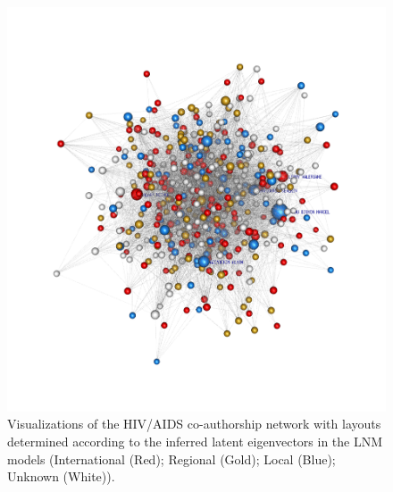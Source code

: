 \begin{figure}[!h]
\includegraphics[scale=0.18,trim={5cm 5cm 5cm 5cm}]{Chapters/hiv/statMod/lnm_mod7_allAttributes.png}
\caption{Visualizations of the HIV/AIDS co-authorship network with layouts determined according to the inferred latent eigenvectors in the LNM models (International (Red); Regional (Gold); Local (Blue); Unknown (White)).
}
\label{fig:hiv_lnm_viz}
\end{figure}

